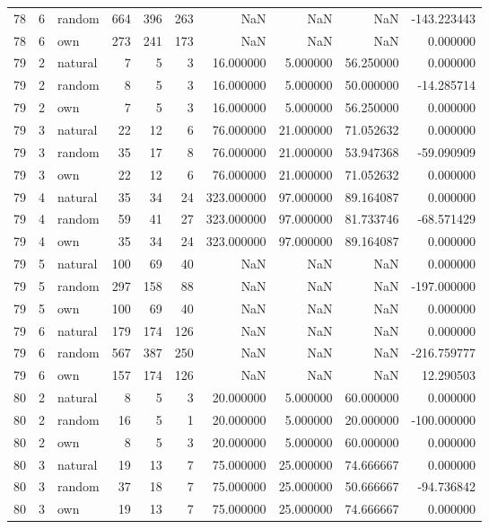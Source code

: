 \begin{table}[htbp]
\begin{tabular}{rrlrrrrrrr}
78 & 6 & random & 664 & 396 & 263 & NaN & NaN & NaN & -143.223443 \\
78 & 6 & own & 273 & 241 & 173 & NaN & NaN & NaN & 0.000000 \\
79 & 2 & natural & 7 & 5 & 3 & 16.000000 & 5.000000 & 56.250000 & 0.000000 \\
79 & 2 & random & 8 & 5 & 3 & 16.000000 & 5.000000 & 50.000000 & -14.285714 \\
79 & 2 & own & 7 & 5 & 3 & 16.000000 & 5.000000 & 56.250000 & 0.000000 \\
79 & 3 & natural & 22 & 12 & 6 & 76.000000 & 21.000000 & 71.052632 & 0.000000 \\
79 & 3 & random & 35 & 17 & 8 & 76.000000 & 21.000000 & 53.947368 & -59.090909 \\
79 & 3 & own & 22 & 12 & 6 & 76.000000 & 21.000000 & 71.052632 & 0.000000 \\
79 & 4 & natural & 35 & 34 & 24 & 323.000000 & 97.000000 & 89.164087 & 0.000000 \\
79 & 4 & random & 59 & 41 & 27 & 323.000000 & 97.000000 & 81.733746 & -68.571429 \\
79 & 4 & own & 35 & 34 & 24 & 323.000000 & 97.000000 & 89.164087 & 0.000000 \\
79 & 5 & natural & 100 & 69 & 40 & NaN & NaN & NaN & 0.000000 \\
79 & 5 & random & 297 & 158 & 88 & NaN & NaN & NaN & -197.000000 \\
79 & 5 & own & 100 & 69 & 40 & NaN & NaN & NaN & 0.000000 \\
79 & 6 & natural & 179 & 174 & 126 & NaN & NaN & NaN & 0.000000 \\
79 & 6 & random & 567 & 387 & 250 & NaN & NaN & NaN & -216.759777 \\
79 & 6 & own & 157 & 174 & 126 & NaN & NaN & NaN & 12.290503 \\
80 & 2 & natural & 8 & 5 & 3 & 20.000000 & 5.000000 & 60.000000 & 0.000000 \\
80 & 2 & random & 16 & 5 & 1 & 20.000000 & 5.000000 & 20.000000 & -100.000000 \\
80 & 2 & own & 8 & 5 & 3 & 20.000000 & 5.000000 & 60.000000 & 0.000000 \\
80 & 3 & natural & 19 & 13 & 7 & 75.000000 & 25.000000 & 74.666667 & 0.000000 \\
80 & 3 & random & 37 & 18 & 7 & 75.000000 & 25.000000 & 50.666667 & -94.736842 \\
80 & 3 & own & 19 & 13 & 7 & 75.000000 & 25.000000 & 74.666667 & 0.000000 \\

\end{tabular}
\end{table}
